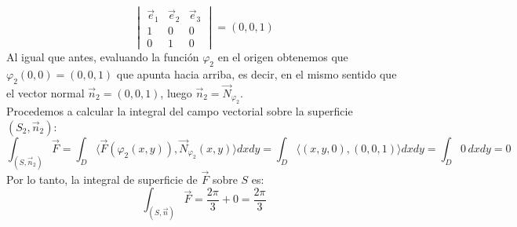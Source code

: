 {\[\begin{vmatrix}
            \vec{e}_1 & \vec{e}_2 & \vec{e}_3 \\
            1         & 0         & 0         \\
            0         & 1         & 0
        \end{vmatrix}
        = (0, 0, 1)
    \]
    Al igual que antes, evaluando la función $\varphi_2$ en el origen obtenemos que
    $\varphi_2(0,0) = (0,0,1)$ que apunta hacia arriba, es decir, en el mismo
    sentido que el vector normal $\vec{n}_2 = (0,0,1)$, luego $\vec{n}_2 =
        \vec{N}_{\varphi_2}$.\\ Procedemos a calcular la integral del campo vectorial
    sobre la superficie $(S_2, \vec{n}_2)$:
    \[
        \int_{(S, \vec{n}_2)} \vec{F} = \int_{D} \langle \vec{F}(\varphi_2(x,y)), \vec{N}_{\varphi_2}(x,y) \rangle dx dy = \int_{D} \langle (x,y,0), (0,0,1) \rangle dx dy = \int_{D} 0 \, dx dy = 0
    \]
    Por lo tanto, la integral de superficie de $\vec{F}$ sobre $S$ es:
    \[
        \int_{(S, \vec{n})} \vec{F} = \frac{2\pi}{3} + 0 = \frac{2\pi}{3}
    \]
}


